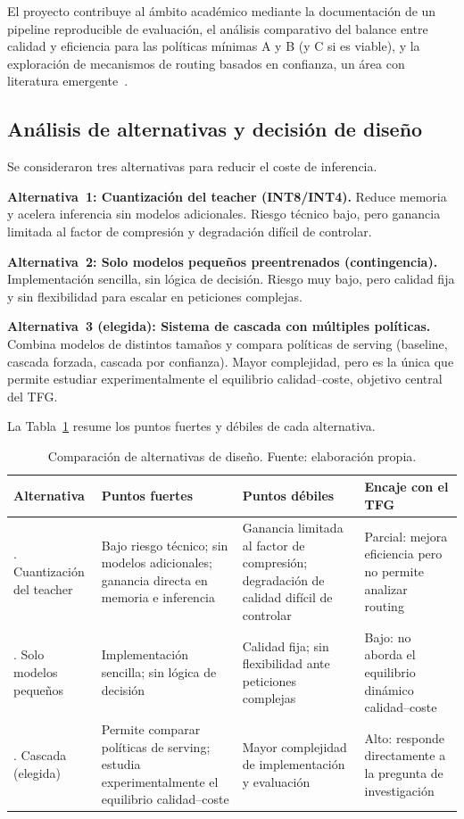 \documentclass[11pt,a4paper]{article}
\begin{document}
El proyecto contribuye al ámbito académico mediante la documentación de un pipeline reproducible de evaluación, el análisis comparativo del balance entre calidad y eficiencia para las políticas mínimas A y B (y C si es viable), y la exploración de mecanismos de routing basados en confianza, un área con literatura emergente~\cite{chen2023frugalgpt, dekoninck2024routing}.

\subsection{Análisis de alternativas y decisión de diseño}

Se consideraron tres alternativas para reducir el coste de inferencia.

\textbf{Alternativa~1: Cuantización del teacher (INT8/INT4).} Reduce memoria y acelera inferencia sin modelos adicionales. Riesgo técnico bajo, pero ganancia limitada al factor de compresión y degradación difícil de controlar.

\textbf{Alternativa~2: Solo modelos pequeños preentrenados (contingencia).} Implementación sencilla, sin lógica de decisión. Riesgo muy bajo, pero calidad fija y sin flexibilidad para escalar en peticiones complejas.

\textbf{Alternativa~3 (elegida): Sistema de cascada con múltiples políticas.} Combina modelos de distintos tamaños y compara políticas de serving (baseline, cascada forzada, cascada por confianza). Mayor complejidad, pero es la única que permite estudiar experimentalmente el equilibrio calidad--coste, objetivo central del TFG.

La Tabla~\ref{tab:alternativas} resume los puntos fuertes y débiles de cada alternativa.

\begin{table}[H]
\centering
\caption{Comparación de alternativas de diseño. Fuente: elaboración propia.}
\label{tab:alternativas}
\footnotesize
\begin{tabularx}{\textwidth}{>{\raggedright\arraybackslash}p{2.8cm} >{\raggedright\arraybackslash}X >{\raggedright\arraybackslash}X >{\raggedright\arraybackslash}p{3cm}}
\toprule
\textbf{Alternativa} & \textbf{Puntos fuertes} & \textbf{Puntos débiles} & \textbf{Encaje con el TFG} \\
\midrule
1. Cuantización del teacher & Bajo riesgo técnico; sin modelos adicionales; ganancia directa en memoria e inferencia & Ganancia limitada al factor de compresión; degradación de calidad difícil de controlar & Parcial: mejora eficiencia pero no permite analizar routing \\
\addlinespace
2. Solo modelos pequeños & Implementación sencilla; sin lógica de decisión & Calidad fija; sin flexibilidad ante peticiones complejas & Bajo: no aborda el equilibrio dinámico calidad--coste \\
\addlinespace
3. Cascada (elegida) & Permite comparar políticas de serving; estudia experimentalmente el equilibrio calidad--coste & Mayor complejidad de implementación y evaluación & Alto: responde directamente a la pregunta de investigación \\
\bottomrule
\end{tabularx}
\end{table}
\end{document}
